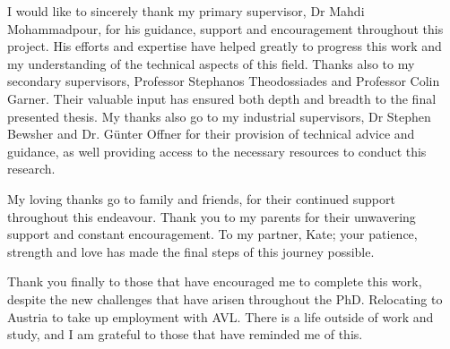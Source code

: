 
\begin{acknowledgements}      

I would like to sincerely thank my primary supervisor, Dr Mahdi Mohammadpour, for his guidance, support and encouragement throughout this project. His efforts and expertise have helped greatly to progress this work and my understanding of the technical aspects of this field. Thanks also to my secondary supervisors, Professor Stephanos Theodossiades and Professor Colin Garner. Their valuable input has ensured both depth and breadth to the final presented thesis. My thanks also go to my industrial supervisors, Dr Stephen Bewsher and Dr. Günter Offner for their provision of technical advice and guidance, as well providing access to the necessary resources to conduct this research.

My loving thanks go to family and friends, for their continued support throughout this endeavour. Thank you to my parents for their unwavering support and constant encouragement. To my partner, Kate; your patience, strength and love has made the final steps of this journey possible.

Thank you finally to those that have encouraged me to complete this work, despite the new challenges that have arisen throughout the PhD. Relocating to Austria to take up employment with AVL. There is a life outside of work and study, and I am grateful to those that have reminded me of this.

\end{acknowledgements}
